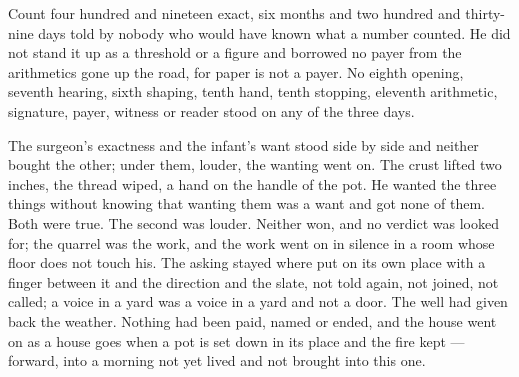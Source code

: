 Count four hundred and nineteen exact, six months and two hundred and thirty-nine days told by nobody who would have known what a number counted. He did not stand it up as a threshold or a figure and borrowed no payer from the arithmetics gone up the road, for paper is not a payer. No eighth opening, seventh hearing, sixth shaping, tenth hand, tenth stopping, eleventh arithmetic, signature, payer, witness or reader stood on any of the three days.

The surgeon's exactness and the infant's want stood side by side and neither bought the other; under them, louder, the wanting went on. The crust lifted two inches, the thread wiped, a hand on the handle of the pot. He wanted the three things without knowing that wanting them was a want and got none of them. Both were true. The second was louder. Neither won, and no verdict was looked for; the quarrel was the work, and the work went on in silence in a room whose floor does not touch his. The asking stayed where put on its own place with a finger between it and the direction and the slate, not told again, not joined, not called; a voice in a yard was a voice in a yard and not a door. The well had given back the weather. Nothing had been paid, named or ended, and the house went on as a house goes when a pot is set down in its place and the fire kept --- forward, into a morning not yet lived and not brought into this one.
